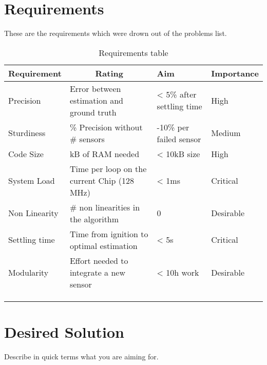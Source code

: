  \cite{}
 
\section{Requirements}
These are the requirements which were drown out of the problems list.
 
 \begin{table}[h]
\centering
\begin{tabular}{|l|l|l|l|}
\hline
Requirement   & \multicolumn{1}{c|}{Rating} & Aim & Importance \\ \hline
Precision     & Error between estimation and ground truth  & < 5\% after settling time & High  \\ \hline
Sturdiness    & \% Precision without \# sensors  & -10\% per failed sensor  & Medium \\ \hline
Code Size     & kB of RAM needed  & < 10kB size & High \\ \hline
System Load   & Time per loop on the current Chip (128 MHz) & < 1ms & Critical \\ \hline
Non Linearity & \# non linearities in the algorithm  & 0 &  Desirable\\ \hline
Settling time & Time from ignition to optimal estimation  & < 5s       &  Critical\\ \hline
Modularity    & Effort needed to integrate a new sensor    & < 10h work     &  Desirable\\ \hline
              &                            &            &  \\ \hline
              &                            &            &  \\ \hline
              &                            &            &  \\ \hline
\end{tabular}
\caption{Requirements table}
\label{tab:Requirements}
\end{table}
 
 \section{Desired Solution}
 
 Describe in quick terms what you are aiming for.